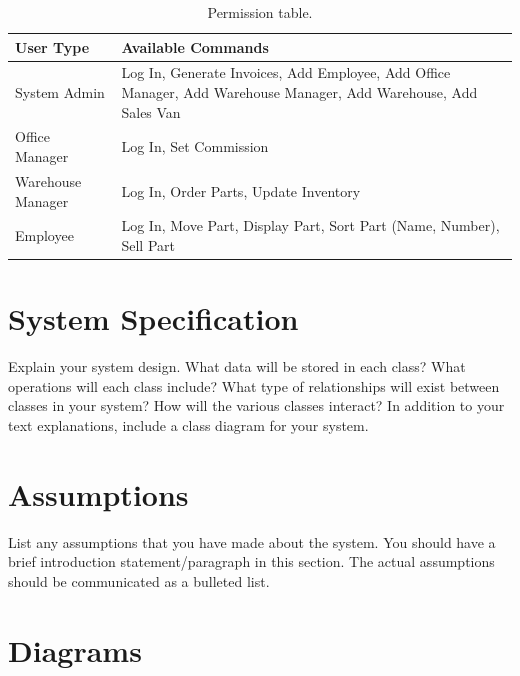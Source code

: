 \documentclass{report}
\begin{document}
\begin{table}
  \begin{center}
      \begin{tabular}{ | l | p{8cm} |}
      \hline
      User Type & Available Commands \\ \hline
      System Admin & Log In, Generate Invoices, Add Employee, Add Office Manager, Add Warehouse Manager, Add Warehouse, Add Sales Van \\ \hline
      Office Manager & Log In, Set Commission\\ \hline
      Warehouse Manager & Log In, Order Parts, Update Inventory \\ \hline
      Employee & Log In, Move Part, Display Part, Sort Part (Name, Number), Sell Part \\
      \hline
      \end{tabular}
  \end{center}
  \caption{Permission table.}
\end{table}

\section{System Specification}
\label{sec:spec}

Explain your system design. What data will be stored in each class?  What operations will each class include?  What type of relationships will exist between classes in your system? How will the various classes interact? In addition to your text explanations, include a class diagram for your system.\par

\section{Assumptions}
\label{sec:assume}

List any assumptions that you have made about the system. You should have a brief introduction statement/paragraph in this section. The actual assumptions should be communicated as a bulleted list.\par

\section{Diagrams}
\end{document}
